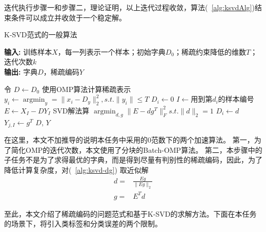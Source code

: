     迭代执行步骤一和步骤二，理论证明\cite{aharon2006rm}，以上迭代过程收敛，算法(~\ref{alg:ksvdAlg})结束条件可以成立并收敛于一个稳定解。

    \begin{algorithm}[b]
    \caption{K-SVD范式的一般算法\cite{aharon2006rm}} %
    \hspace*{0.02in} {\bf 输入:} %
    训练样本$X $，每一列表示一个样本；初始字典$D_0$；稀疏约束降低的维数$T$；迭代次数$k$ \\
    \hspace*{0.02in} {\bf 输出:} %
    字典$D$，稀疏编码$Y$
    \begin{algorithmic}[1]
    \State 令 $D \leftarrow D_0$
            \State 使用OMP算法计算稀疏表示 $y_i \leftarrow \mathop{\arg\min}_{y} = \|x_i - D_y\| ^2_2, s.t. \|y_i\| \le T $  \label{alg:line:omp}
        \EndFor
            \State $D_i \leftarrow 0$
            \State $I \leftarrow 用到第d_i的样本编号$
            \State $E \leftarrow X_I - D Y_I$
            \State SVD解法算 $\mathop{\arg\min}_{d, g}\|E - dg^T\|^2 _F s.t. \|d\|_2 = 1 $\label{alg:line:appro}
            \State $D_i \leftarrow d$
            \State $Y_{j, I} \leftarrow g^T$
        \EndFor
    \EndFor
    \State \Return $D$, $Y$
    \end{algorithmic}
    \label{alg:ksvdAlg}
    \end {algorithm}

    在这里，本文不加推导的说明本任务中采用的0范数下的两个加速算法。
    第一，为了简化OMP的迭代次数，本文使用了分块的Batch-OMP算法\cite{rubinstein2008efficient}。
    第二，本步骤中的子任务不是为了求得最优的字典，而是得到尽量有判别性的稀疏编码，因此，为了降低计算复杂度，对(~\ref{alg:ksvd-dg}) 取近似解\cite{rubinstein2008efficient}
    \begin{equation}
    \begin{split}
    d = & \frac{Eg}{\|Eg\|_2} \\
    g = & E^T d
    \end{split}
    \end{equation}

    至此，本文介绍了稀疏编码的问题范式和基于K-SVD的求解方法。下面在本任务的场景下，将引入类标签和分类误差的两个限制。

    


